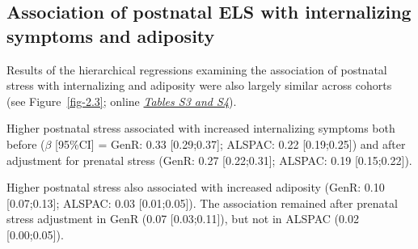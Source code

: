 \documentclass[
  letterpaper,
  DIV=11,
  numbers=noendperiod]{scrreport}
\begin{document}
\subsection{Association of postnatal ELS with internalizing symptoms and
adiposity}\label{association-of-postnatal-els-with-internalizing-symptoms-and-adiposity-1}

Results of the hierarchical regressions examining the association of
postnatal stress with internalizing and adiposity were also largely
similar across cohorts (see Figure~\ref{fig-2.3}; online
\href{https://osf.io/7e4x8}{\emph{Tables S3 and S4}}).

Higher postnatal stress associated with increased internalizing symptoms
both before (\(\beta\) {[}95\%CI{]} = GenR: 0.33 {[}0.29;0.37{]};
ALSPAC: 0.22 {[}0.19;0.25{]}) and after adjustment for prenatal stress
(GenR: 0.27 {[}0.22;0.31{]}; ALSPAC: 0.19 {[}0.15;0.22{]}).

Higher postnatal stress also associated with increased adiposity (GenR:
0.10 {[}0.07;0.13{]}; ALSPAC: 0.03 {[}0.01;0.05{]}). The association
remained after prenatal stress adjustment in GenR (0.07
{[}0.03;0.11{]}), but not in ALSPAC (0.02 {[}0.00;0.05{]}).
\end{document}
